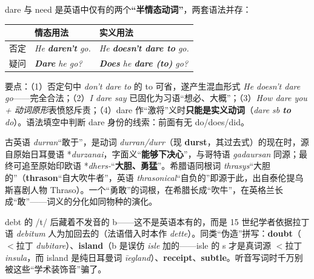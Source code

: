 \documentclass[../main.tex]{subfiles}
\begin{document}
\begin{gram}
dare 与 need 是英语中仅有的两个\textbf{“半情态动词”}，两套语法并存：
\begin{center}
\begin{tabular}{lll}
\toprule
 & 情态用法 & 实义用法 \\
\midrule
否定 & \textit{He \textbf{daren't} go.} & \textit{He \textbf{doesn't dare to} go.} \\
疑问 & \textit{\textbf{Dare} he go?} & \textit{\textbf{Does} he \textbf{dare (to)} go?} \\
\bottomrule
\end{tabular}
\end{center}
要点：（1）否定句中 \textit{don't dare to} 的 to 可省，遂产生混血形式 \textit{He doesn't dare go}——完全合法；（2）\textit{I dare say} 已固化为习语“想必、大概”；（3）\textit{How dare you + 动词原形}表愤怒斥责；（4）dare 作“激将”义时\textbf{只能是实义动词}（\textit{dare sb \textbf{to} do}）。语法填空中判断 dare 身份的线索：前面有无 do/does/did。
\end{gram}

\begin{origin}
古英语 \textit{durran}“敢于”，是动词 \textit{durran/durr}（现 \textbf{durst}，其过去式）的现在时，源自原始日耳曼语 *\textit{durzanai}，字面义“\textbf{能够下决心}”，与哥特语 \textit{gadaursan} 同源；最终可追至原始印欧语 *\textit{dhers-}“\textbf{大胆、勇猛}”。希腊语同根词 \textit{thrasys}“大胆的”（\textbf{thrason}“自大吹牛者”，英语 \textit{thrasonical}“自负的”即源于此，出自泰伦提乌斯喜剧人物 Thraso）。一个“勇敢”的词根，在希腊长成“吹牛”，在英格兰长成“敢”——词义的分化如同物种的演化。
\end{origin}




\begin{gram}[哑音 b 与“词源矫正”拼写]
debt 的 /t/ 后藏着不发音的 b——这不是英语本有的，而是 15 世纪学者依据拉丁语 \textit{debitum} 人为加回去的（法语借入时本作 \textit{dette}）。同类“伪造”拼写：\textbf{doubt}（$<$拉丁 \textit{dubitare}）、\textbf{island}（b 是误仿 \textit{isle} 加的——isle 的 s 才是真词源 $<$拉丁 \textit{insula}，而 island 是纯日耳曼词 \textit{īegland}）、\textbf{receipt}、\textbf{subtle}。听音写词时千万别被这些“学术装饰音”骗了。
\end{gram}
\end{document}
